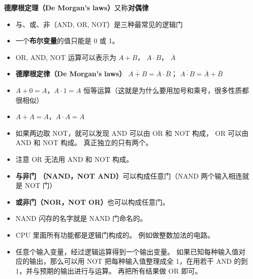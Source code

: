 
\begin{issues}
\issueDraft
\end{issues}

\textbf{德摩根定理（De Morgan's laws）}又称\textbf{对偶律}

\begin{itemize}
\item 与、或、非（AND, OR, NOT）是三种最常见的逻辑门
\item 一个\textbf{布尔变量}的值只能是 0 或 1。
\item OR, AND, NOT 运算可以表示为 $A + B$， $A\cdot B$， $\overline A$
\item \textbf{德摩根定律（De Morgan's laws）} $\overline{A+B} = \overline A \cdot \overline B$； $\overline{A \cdot B} = \overline A + \overline B$
\item $A+0=A$，$A\cdot 1=A$ 恒等运算（这就是为什么要用加号和乘号，很多性质都很相似）
\item $A+A=A$，$A\cdot A=A$
\item 如果两边取 NOT，就可以发现 AND 可以由 OR 和 NOT 构成， OR 可以由 AND 和 NOT 构成。 真正独立的只有两个。
\item 注意 OR 无法用 AND 和 NOT 构成。
\item \textbf{与非门 （NAND，NOT AND）}可以构成任意门（NAND 两个输入相连就是 NOT 门）
\item \textbf{或非门（NOR，NOT OR）}也可以构成任意门。 
\item NAND 闪存的名字就是 NAND 门命名的。
\item CPU 里面所有功能都是逻辑门构成的。 例如做整数加法的电路。
\item 任意个输入变量，经过逻辑运算得到一个输出变量。 如果已知每种输入值对应的输出，那么可以用 NOT 把每种输入值整理成全 1，在用若干 AND 的到 1，并与预期的输出进行与运算。 再把所有结果做 OR 即可。
\end{itemize}
